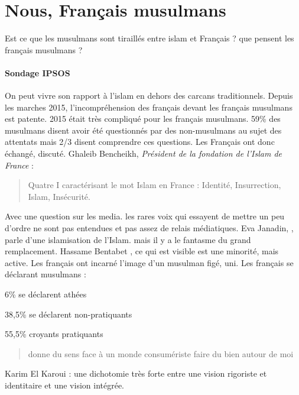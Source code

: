 \section{Nous, Français musulmans}


Est ce que les musulmans sont tiraillés entre islam et Français ? que pensent les français musulmans ?
\paragraph{Sondage IPSOS} 
On peut vivre son rapport à l'islam en dehors des carcans traditionnels. Depuis les marches 2015, l'incompréhension des français devant les français musulmans est patente. 
2015 était très compliqué pour les français musulmans. 
59\% des musulmans disent avoir été questionnés par des non-musulmans au sujet des attentats mais 2/3 disent comprendre ces questions. Les Français ont donc échangé, discuté. 
Ghaleib Bencheikh, \emph{Président de la fondation de l'Islam de France} :
\begin{quote}
    Quatre I caractérisant le mot Islam en France : Identité, Insurrection, Islam, Insécurité.
\end{quote}
Avec une question sur les media. les rares voix qui essayent de mettre un peu d'ordre ne sont pas entendues et pas assez de relais médiatiques. 
Eva Janadin, , parle d'une islamisation de l'Islam. mais il y a le fantasme du grand remplacement.
Hassame Bentabet , ce qui est visible est une minorité, mais active.  Les français ont incarné l'image d'un musulman figé, uni.  
Les français se déclarant musulmans :
\bi
\item 6\% se déclarent athées
\item 38,5\% se déclarent non-pratiquants
\item 55,5\% croyants pratiquants
\ei

\begin{quote}
    donne du sens face à un monde consumériste 
    faire du bien autour de moi
    
\end{quote}

Karim El Karoui : une dichotomie très forte entre une vision rigoriste et identitaire et une vision intégrée.


